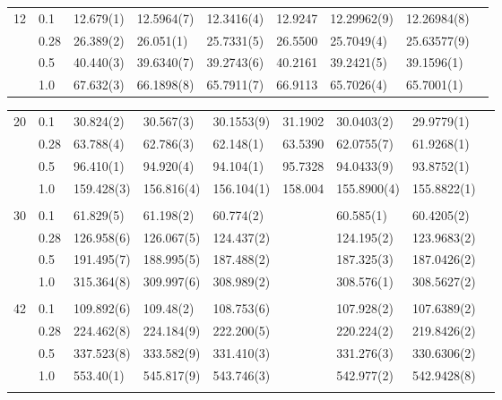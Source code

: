 {\begin{landscape}
\begin{table}
\begin{tabularx}{\hsize}{llR{2.65cm}R{2.65cm}R{2.65cm}R{2.65cm}R{2.65cm}R{2.65cm}R{2.65cm}}
				12 & 0.1 & 12.679(1) & 12.5964(7) & 12.3416(4) & 12.9247 & 12.29962(9) & 12.26984(8) \\ 
				& 0.28 & 26.389(2) & 26.051(1) & 25.7331(5) & 26.5500 & 25.7049(4) & 25.63577(9) \\
				& 0.5 & 40.440(3) & 39.6340(7) & 39.2743(6) & 40.2161 & 39.2421(5) & 39.1596(1) \\
				& 1.0 & 67.632(3) & 66.1898(8) & 65.7911(7) & 66.9113 & 65.7026(4) & 65.7001(1) \\ \hline
			\end{tabularx}
		\end{table}
		
		\begin{table}
			\label{tab:quantumdotswinteraction2D2}
			\begin{tabularx}{\hsize}{llR{2.65cm}R{2.65cm}R{2.65cm}R{2.65cm}R{2.65cm}R{2.65cm}R{2.65cm}} \\
				20 & 0.1 & 30.824(2) & 30.567(3) & 30.1553(9) & 31.1902 & 30.0403(2) & 29.9779(1) \\ 
				& 0.28 & 63.788(4) & 62.786(3) & 62.148(1) & 63.5390 & 62.0755(7) & 61.9268(1) \\
				& 0.5 & 96.410(1) & 94.920(4) & 94.104(1) & 95.7328 & 94.0433(9) & 93.8752(1) \\
				& 1.0 & 159.428(3) & 156.816(4) & 156.104(1) & 158.004 & 155.8900(4) & 155.8822(1) & \phantom{=} \\ 
				\hline \\
				
				30 & 0.1 & 61.829(5) & 61.198(2) & 60.774(2) & & 60.585(1) & 60.4205(2) \\ 
				& 0.28 & 126.958(6) & 126.067(5) & 124.437(2) & & 124.195(2) & 123.9683(2) \\
				& 0.5 & 191.495(7) & 188.995(5) & 187.488(2) & & 187.325(3) & 187.0426(2) \\
				& 1.0 & 315.364(8) & 309.997(6) & 308.989(2) & & 308.576(1) & 308.5627(2) \\ \hline \\
				
				42 & 0.1 & 109.892(6) & 109.48(2) & 108.753(6) & &  107.928(2) & 107.6389(2) \\ 
				& 0.28 & 224.462(8) & 224.184(9) & 222.200(5) & & 220.224(2) & 219.8426(2) \\
				& 0.5 & 337.523(8) & 333.582(9) & 331.410(3) & & 331.276(3) & 330.6306(2) \\
				& 1.0 & 553.40(1) & 545.817(9) & 543.746(3) & & 542.977(2) & 542.9428(8) \\ \hline \\
				

\end{tabularx}
\end{table}
\end{landscape}}

